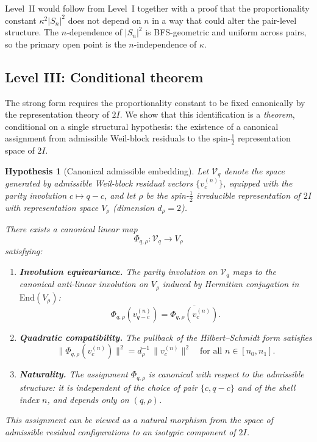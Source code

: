 \documentclass[12pt,a4paper]{article}
\newtheorem{hypothesis}[theorem]{Hypothesis}
\theoremstyle{definition}
\theoremstyle{remark}
\begin{document}
    Level~II would follow from Level~I together with a proof that the proportionality
    constant $\kappa^2 |S_n|^2$ does not depend on $n$ in a way that could alter
    the pair-level structure.
    The $n$-dependence of $|S_n|^2$ is BFS-geometric and uniform across pairs,
    so the primary open point is the $n$-independence of $\kappa$.

  \subsection{Level III: Conditional theorem}
    \label{sec:level3}

    The strong form requires the proportionality constant to be fixed canonically by
    the representation theory of $2I$.
    We show that this identification is a \emph{theorem}, conditional on a single
    structural hypothesis: the existence of a canonical assignment from admissible
    Weil-block residuals to the spin-$\frac{1}{2}$ representation space of $2I$.

    \begin{hypothesis}[Canonical admissible embedding]
      \label{hyp:embedding}
      Let $\mathcal{V}_q$ denote the space generated by admissible Weil-block
      residual vectors $\{v_c^{(n)}\}$, equipped with the parity involution
      $c \mapsto q-c$, and let $\rho$ be the spin-$\frac{1}{2}$ irreducible
      representation of $2I$ with representation space $V_\rho$ (dimension $d_\rho = 2$).

      There exists a canonical linear map
      \begin{equation}
        \Phi_{q,\rho} : \mathcal{V}_q \longrightarrow V_\rho
        \label{eq:embedding}
      \end{equation}
      satisfying:
      \begin{enumerate}[label=(\alph*)]
    \item \textbf{Involution equivariance.}
    The parity involution on $\mathcal{V}_q$ maps to the canonical
    anti-linear involution on $V_\rho$ induced by Hermitian conjugation
    in $\mathrm{End}(V_\rho)$:
    \begin{equation}
      \Phi_{q,\rho}(v_{q-c}^{(n)}) = \overline{\Phi_{q,\rho}(v_c^{(n)})}.
      \label{eq:hyp-involution}
    \end{equation}
    \item \textbf{Quadratic compatibility.}
    The pullback of the Hilbert--Schmidt form satisfies
    \begin{equation}
      \|\Phi_{q,\rho}(v_c^{(n)})\|^2 = d_\rho^{-1}\,\|v_c^{(n)}\|^2
      \quad \text{for all } n \in [n_0, n_1].
    \end{equation}
    \item \textbf{Naturality.}
    The assignment $\Phi_{q,\rho}$ is canonical with respect to the
    admissible structure: it is independent of the choice of pair
    $\{c, q-c\}$ and of the shell index $n$, and depends only on
    $(q, \rho)$.
      \end{enumerate}
      This assignment can be viewed as a natural morphism from the space of admissible
      residual configurations to an isotypic component of $2I$.
    \end{hypothesis}
\end{document}
